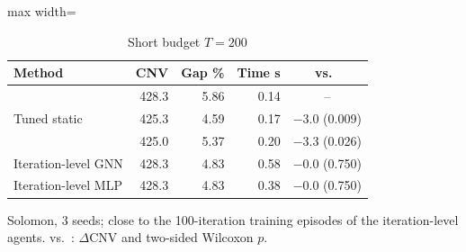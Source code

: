 \begin{table}[t]
\centering
\caption{Short budget $T=200$}\label{tab:short}
\setlength{\tabcolsep}{3pt}
\begin{adjustbox}{max width=\linewidth}
\begin{tabular}{lrrrc}
\toprule
Method & CNV & Gap \% & Time s & vs.\ \Rw{}\\ \midrule
\Rw{} & 428.3 & 5.86 & 0.14 & --\\
Tuned static & 425.3 & 4.59 & 0.17 & $-$3.0 (0.009)\\
\sgalns{} & 425.0 & 5.37 & 0.20 & $-$3.3 (0.026)\\
Iteration-level GNN & 428.3 & 4.83 & 0.58 & $-$0.0 (0.750)\\
Iteration-level MLP & 428.3 & 4.83 & 0.38 & $-$0.0 (0.750)\\
\bottomrule
\end{tabular}
\end{adjustbox}
\par\vspace{2pt}\parbox{\linewidth}{\footnotesize Solomon, 3 seeds; close to the 100-iteration training episodes of the iteration-level agents. vs.\ \Rw{}: $\Delta$CNV and two-sided Wilcoxon $p$.}
\end{table}
